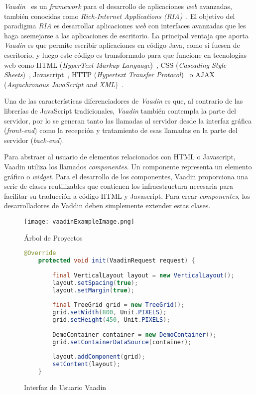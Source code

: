 

\emph{Vaadin}~\cite{vaadin} es un \emph{framework} para el desarrollo de aplicaciones \emph{web} avanzadas, también conocidas como \emph{Rich-Internet Applications (RIA)}~\cite{ria}. El objetivo del paradigma \emph{RIA} es desarrollar aplicaciones \emph{web} con interfaces avanzadas que les haga asemejarse a las aplicaciones de escritorio. La principal ventaja que aporta \emph{Vaadin} es que permite escribir aplicaciones en código Java, como si fuesen de escritorio, y luego este código es transformado para que funcione en tecnologías web como HTML (\emph{HyperText Markup Language})~\cite{html}, CSS (\emph{Cascading Style Sheets})~\cite{css}, Javascript~\cite{javascript}, HTTP (\emph{Hypertext Transfer Protocol})~\cite{http} o AJAX (\emph{Asynchronous JavaScript and XML})~\cite{ajax}.

Una de las características diferenciadores de \emph{Vaadin} es que, al contrario de las librerías de JavaScript tradicionales, \emph{Vaadin} también contempla la parte del servidor, por lo se generan tanto las llamadas al servidor desde la interfaz gráfica (\emph{front-end}) como la recepción y tratamiento de esas llamadas en la parte del servidor (\emph{back-end}).

Para abstraer al usuario de elementos relacionados con HTML o Javascript, Vaadin utiliza los llamados \emph{componentes}. Un componente representa un elemento gráfico o \emph{widget}. Para el desarrollo de los componentes, Vaadin proporciona una serie de clases reutilizables que contienen los infraestructura necesaria para facilitar su traducción a código HTML y Javascript. Para crear \emph{componentes}, los desarrolladores de Vaddin deben simplemente extender estas clases.
 	
\begin{figure}[!tb]
	\centering
	\texttt{[image: vaadinExampleImage.png]}
	\caption{Árbol de Proyectos}
	\label{fig:vaadinExampleImage}
\end{figure}

\begin{figure}[!tb]
	\centering
	\begin{lstlisting}[language=Java]
	@Override
	protected void init(VaadinRequest request) {
	
		final VerticalLayout layout = new VerticalLayout();
		layout.setSpacing(true);
		layout.setMargin(true);
		
		final TreeGrid grid = new TreeGrid();
		grid.setWidth(800, Unit.PIXELS);
		grid.setHeight(450, Unit.PIXELS);
		
		DemoContainer container = new DemoContainer();
		grid.setContainerDataSource(container);
		
		layout.addComponent(grid);
		setContent(layout);
	}
    \end{lstlisting}
    \vspace{-15pt}
	\caption{Interfaz de Usuario Vaadin}
	\label{fig:uiVaadin}
\end{figure}

